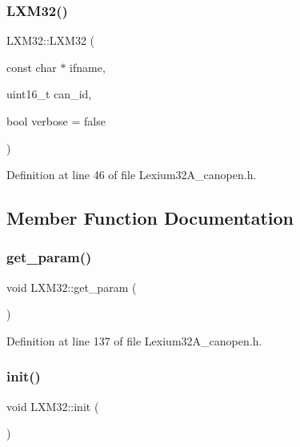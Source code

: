 \subsubsection{\texorpdfstring{L\+X\+M32()}{LXM32()}}
{\footnotesize\ttfamily L\+X\+M32\+::\+L\+X\+M32 (\begin{DoxyParamCaption}\item[{const char $\ast$}]{ifname,  }\item[{uint16\+\_\+t}]{can\+\_\+id,  }\item[{bool}]{verbose = {\ttfamily false} }\end{DoxyParamCaption})\hspace{0.3cm}{\ttfamily [inline]}}



Definition at line 46 of file Lexium32\+A\+\_\+canopen.\+h.



\subsection{Member Function Documentation}
\mbox{\label{class_l_x_m32_aa36cd9154a11f3388715fa2f482c37ca}} 
\subsubsection{\texorpdfstring{get\+\_\+param()}{get\_param()}}
{\footnotesize\ttfamily void L\+X\+M32\+::get\+\_\+param (\begin{DoxyParamCaption}{ }\end{DoxyParamCaption})\hspace{0.3cm}{\ttfamily [inline]}}



Definition at line 137 of file Lexium32\+A\+\_\+canopen.\+h.

\mbox{\label{class_l_x_m32_a3d325b9b19432dc05240ccfc328363d9}} 
\subsubsection{\texorpdfstring{init()}{init()}}
{\footnotesize\ttfamily void L\+X\+M32\+::init (\begin{DoxyParamCaption}{ }\end{DoxyParamCaption})\hspace{0.3cm}{\ttfamily [inline]}}



